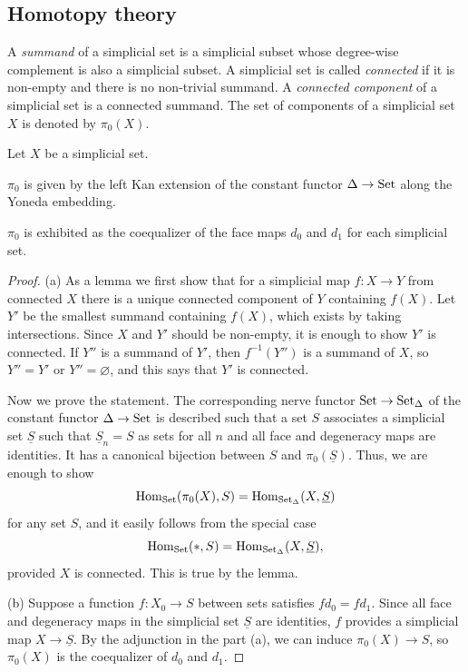 \documentclass{../../../small}
\begin{document}
\subsection{Homotopy theory}


\begin{definition*}
A \emph{summand} of a simplicial set is a simplicial subset whose degree-wise complement is also a simplicial subset.
A simplicial set is called \emph{connected} if it is non-empty and there is no non-trivial summand.
A \emph{connected component} of a simplicial set is a connected summand.
The set of components of a simplicial set $X$ is denoted by $\pi_0(X)$.
\end{definition*}

\begin{proposition*}
Let $X$ be a simplicial set.

\begin{parts}
\item
$\pi_0$ is given by the left Kan extension of the constant functor $\Delta\to\operatorname{Set}$ along the Yoneda embedding.
\item
$\pi_0$ is exhibited as the coequalizer of the face maps $d_0$ and $d_1$ for each simplicial set.
\end{parts}
\end{proposition*}
\begin{proof}
(a)
As a lemma we first show that for a simplicial map $f:X\to Y$ from connected $X$ there is a unique connected component of $Y$ containing $f(X)$.
Let $Y'$ be the smallest summand containing $f(X)$, which exists by taking intersections.
Since $X$ and $Y'$ should be non-empty, it is enough to show $Y'$ is connected.
If $Y''$ is a summand of $Y'$, then $f^{-1}(Y'')$ is a summand of $X$, so $Y''=Y'$ or $Y''=\varnothing$, and this says that $Y'$ is connected.

Now we prove the statement.
The corresponding nerve functor $\operatorname{Set}\to\operatorname{Set}_\Delta$ of the constant functor $\Delta\to\operatorname{Set}$ is described such that a set $S$ associates a simplicial set $\underline S$ such that $\underline S_n=S$ as sets for all $n$ and all face and degeneracy maps are identities.
It has a canonical bijection between $S$ and $\pi_0(\underline S)$.
Thus, we are enough to show
\[\operatorname{Hom}_{\operatorname{Set}}(\pi_0(X),S)=\operatorname{Hom}_{\operatorname{Set}_\Delta}(X,\underline S)\]
for any set $S$, and it easily follows from the special case
\[\operatorname{Hom}_{\operatorname{Set}}(*,S)=\operatorname{Hom}_{\operatorname{Set}_\Delta}(X,\underline S),\]
provided $X$ is connected.
This is true by the lemma.


(b)
Suppose a function $f:X_0\to S$ between sets satisfies $fd_0=fd_1$.
Since all face and degeneracy maps in the simplicial set $\underline S$ are identities, $f$ provides a simplicial map $X\to\underline S$.
By the adjunction in the part (a), we can induce $\pi_0(X)\to S$, so $\pi_0(X)$ is the coequalizer of $d_0$ and $d_1$.
\end{proof}
\end{document}
